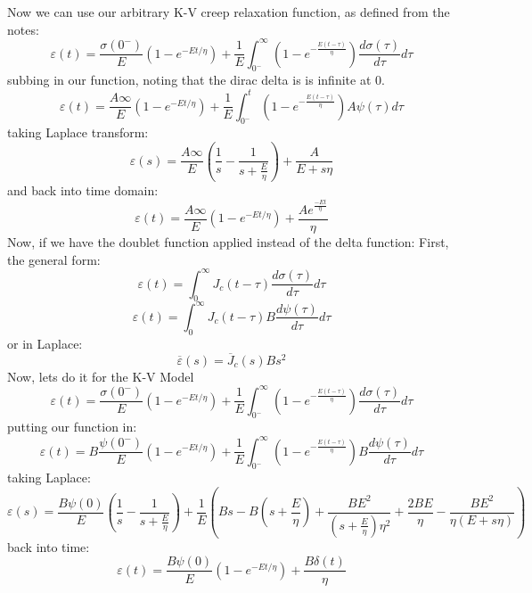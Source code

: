 Now we can use our arbitrary K-V creep relaxation function, as defined from the notes:
\begin{equation}
    \varepsilon(t) = \frac{\sigma(0^-)}{E}(1-e^{-Et/\eta})+\frac{1}{E}\int_{0^-}^{\infty}(1-e^{-\frac{E(t-\tau)}{\eta}})\frac{d\sigma(\tau)}{d\tau}d\tau
\end{equation}
subbing in our function, noting that the dirac delta is is infinite at 0.
\begin{equation}
    \varepsilon(t) = \frac{A\infty}{E}(1-e^{-Et/\eta})+\frac{1}{E}\int_{0^-}^{t}(1-e^{-\frac{E(t-\tau)}{\eta}})A\psi(\tau)d\tau
\end{equation}
taking Laplace transform:
\begin{equation}
 \varepsilon(s) =    \frac{A\infty}{E}(\frac{1}{s}-\frac{1}{s+\frac{E}{\eta}}) + \frac{A}{E+s\eta}
\end{equation}
and back into time domain:
\begin{equation}
    \boxed{\varepsilon(t)=\frac{A\infty}{E}(1-e^{-Et/\eta})+\frac{A e^{\frac{-Et}{\eta}}}{\eta}}
\end{equation}
Now, if we have the doublet function applied instead of the delta function: First, the general form:
\begin{equation}
    \varepsilon(t) = \int_0^{\infty}J_c(t-\tau)\frac{d\sigma(\tau)}{d\tau}d\tau
\end{equation}
\begin{equation}
    \boxed{\varepsilon(t) = \int_0^{\infty}J_c(t-\tau)B\frac{d\psi(\tau)}{d\tau} d\tau}
\end{equation}
or in Laplace:
\begin{equation}
    \boxed{\overline{\varepsilon}(s) = \overline{J}_c(s)Bs^2}
\end{equation}
Now, lets do it for the K-V Model
\begin{equation}
    \varepsilon(t) = \frac{\sigma(0^-)}{E}(1-e^{-Et/\eta})+\frac{1}{E}\int_{0^-}^{\infty}(1-e^{-\frac{E(t-\tau)}{\eta}})\frac{d\sigma(\tau)}{d\tau}d\tau
\end{equation}
putting our function in:
\begin{equation}
    \varepsilon(t) = B\frac{\psi(0^-)}{E}(1-e^{-Et/\eta})+\frac{1}{E}\int_{0^-}^{\infty}(1-e^{-\frac{E(t-\tau)}{\eta}})B\frac{d\psi(\tau)}{d\tau}d\tau
\end{equation}
taking Laplace:
\begin{equation}
    \varepsilon(s)=\frac{B\psi(0)}{E}(\frac{1}{s}-\frac{1}{s+\frac{E}{\eta}})+\frac{1}{E}(Bs-B(s+\frac{E}{\eta})+\frac{B E^2}{(s+\frac{E}{\eta})\eta^2}+\frac{2BE}{\eta}-\frac{BE^2}{\eta(E+s\eta)})
\end{equation}
back into time:
\begin{equation}
    \boxed{\varepsilon(t)=\frac{B\psi(0)}{E}(1-e^{-Et/\eta})+\frac{B \delta(t)}{\eta}}
\end{equation}

